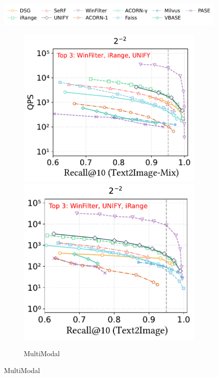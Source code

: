 \documentclass[sigconf, nonacm]{acmart}
\begin{document}
\begin{figure}[t]
	\centering
	
	\includegraphics[width=0.98\columnwidth]{figures/exp/range_legend.pdf}
	\vspace{0.2cm} %
	
	\begin{subfigure}[t]{0.98\columnwidth}
		\centering
		\includegraphics[width=0.507\linewidth]{figures/exp/range_multimodel.pdf}
		\hfill %
		\includegraphics[width=0.48\linewidth]{figures/exp/range_multimodel_1.pdf}
		
		\captionsetup{font=small}
		\caption{MultiModal}
		\label{fig:MultiModal_range} %
	\end{subfigure}
	

\end{figure}
\end{document}
